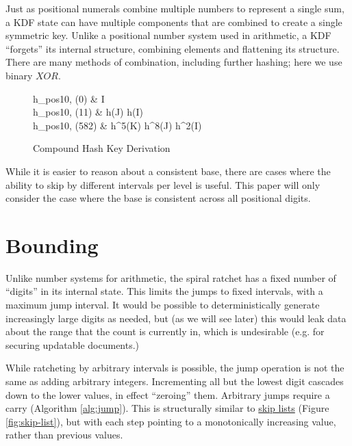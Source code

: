 \documentclass{article}
\begin{document}
    Just as positional numerals combine multiple numbers to represent a single sum, a KDF state can have multiple components that are combined to create a single symmetric key. Unlike a positional number system used in arithmetic, a KDF ``forgets'' its internal structure, combining elements and flattening its structure. There are many methods of combination, including further hashing; here we use binary $XOR$.
    
	\begin{figure}[h]
		\begin{flalign}
			h_{pos10, \oplus}(0)   & \Rightarrow I \nonumber \\
			h_{pos10, \oplus}(11)  & \Rightarrow h(J) \oplus h(I) \nonumber \\
			h_{pos10, \oplus}(582) & \Rightarrow h^{5}(K) \oplus h^{8}(J) \oplus h^{2}(I) \nonumber 
		\end{flalign}
	
		\caption{Compound Hash Key Derivation}
	\end{figure}
    
	While it is easier to reason about a consistent base, there are cases where the ability to skip by different intervals per level is useful. This paper will only consider the case where the base is consistent across all positional digits.
    
    \section{Bounding}
    
    Unlike number systems for arithmetic, the spiral ratchet has a fixed number of ``digits'' in its internal state. This limits the jumps to fixed intervals, with a maximum jump interval.  It would be possible to deterministically generate increasingly large digits as needed, but (as we will see later) this would leak data about the range that the count is currently in, which is undesirable (e.g. for securing updatable documents.)
    
    While ratcheting by arbitrary intervals is possible, the jump operation is not the same as adding arbitrary integers. Incrementing all but the lowest digit cascades down to the lower values, in effect ``zeroing'' them. Arbitrary jumps require a carry (Algorithm \ref{alg:jump}). This is structurally similar to \href{https://en.wikipedia.org/wiki/Skip_list}{skip lists} (Figure \ref{fig:skip-list}), but with each step pointing to a monotonically increasing value, rather than previous values. \\
 
\end{document}
